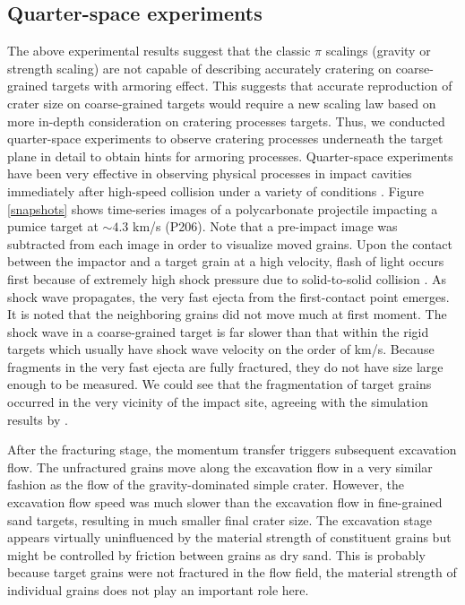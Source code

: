 \documentclass[3p,authoryear]{elsarticle}
\begin{document}
\subsection{Quarter-space experiments}\label{sec:observation}

The above experimental results suggest that the classic $\pi$ scalings (gravity or strength scaling) are not capable of describing accurately cratering on coarse-grained targets with armoring effect. This suggests that accurate reproduction of crater size on coarse-grained targets would require a new scaling law based on more in-depth consideration on cratering processes targets.
Thus, we conducted quarter-space experiments to observe cratering processes underneath the target plane in detail to obtain hints for armoring processes.
Quarter-space experiments have been very effective in observing physical processes in impact cavities immediately after high-speed collision under a variety of conditions \citep[e.g.][]{pietukowski1980,schultz2015}.
Figure \ref{snapshots} shows time-series images of a polycarbonate projectile impacting a pumice target at $\sim 4.3$ km/s (P206).
Note that a pre-impact image was subtracted from each image in order to visualize moved grains.
Upon the contact between the impactor and a target grain at a high velocity, flash of light occurs first because of extremely high shock pressure due to solid-to-solid collision \citep[e.g.][]{sugita1998}.
As shock wave propagates, the very fast ejecta from the first-contact point emerges.
It is noted that the neighboring grains did not move much at first moment.
The shock wave in a coarse-grained target is far slower than that within the rigid targets which usually have shock wave velocity on the order of km/s.
Because fragments in the very fast ejecta are fully fractured, they do not have size large enough to be measured.
We could see that the fragmentation of target grains occurred in the very vicinity of the impact site, agreeing with the simulation results by \citet{barnouin2002}.

After the fracturing stage, the momentum transfer triggers subsequent excavation flow.
The unfractured grains move along the excavation flow in a very similar fashion as the flow of the gravity-dominated simple crater.
However, the excavation flow speed was much slower than the excavation flow in fine-grained sand targets, resulting in much smaller final crater size.
The excavation stage appears virtually uninfluenced by the material strength of constituent grains but might be controlled by friction between grains as dry sand.
This is probably because target grains were not fractured in the flow field, the material strength of individual grains does not play an important role here. %
\end{document}
